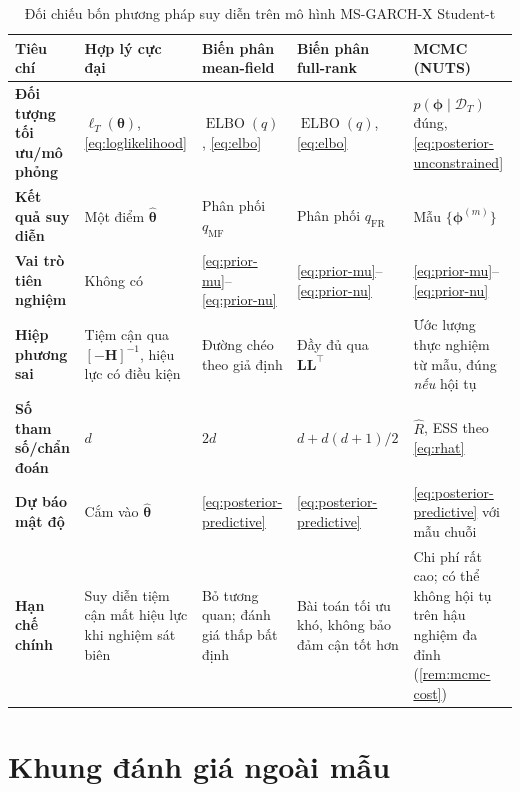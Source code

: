\documentclass[12pt,a4paper]{article}
\numberwithin{equation}{section}
\theoremstyle{definition}
\newcommand{\ELBO}{\operatorname{ELBO}}
\newcommand{\Data}{\mathcal{D}}
\newcommand{\Param}{\symbf{\theta}}
\newcommand{\vecphi}{\symbf{\phi}}
\begin{document}
	\begin{table}[H]
		\centering\scriptsize
		\setlength{\tabcolsep}{3pt}
		\caption{Đối chiếu bốn phương pháp suy diễn trên mô hình MS-GARCH-X Student-t}
		\label{tab:comparison}
		\begin{tabularx}{\textwidth}{>{\raggedright\arraybackslash\bfseries}p{2.0cm} Y Y Y Y}
			\toprule
			\textbf{Tiêu chí} & \textbf{Hợp lý cực đại} & \textbf{Biến phân mean-field} & \textbf{Biến phân full-rank} & \textbf{MCMC (NUTS)} \\
			\midrule
			Đối tượng tối ưu/mô phỏng & $\ell_T(\Param)$, \eqref{eq:loglikelihood} & $\ELBO(q)$, \eqref{eq:elbo} & $\ELBO(q)$, \eqref{eq:elbo} & $p(\vecphi\mid\Data_T)$ đúng, \eqref{eq:posterior-unconstrained} \\
			\addlinespace[0.2em]
			Kết quả suy diễn & Một điểm $\hat{\Param}$ & Phân phối $q_{\mathrm{MF}}$ & Phân phối $q_{\mathrm{FR}}$ & Mẫu $\{\vecphi^{(m)}\}$ \\
			\addlinespace[0.2em]
			Vai trò tiên nghiệm & Không có & \eqref{eq:prior-mu}--\eqref{eq:prior-nu} & \eqref{eq:prior-mu}--\eqref{eq:prior-nu} & \eqref{eq:prior-mu}--\eqref{eq:prior-nu} \\
			\addlinespace[0.2em]
			Hiệp phương sai & Tiệm cận qua $[-\symbf H]^{-1}$, hiệu lực có điều kiện & Đường chéo theo giả định & Đầy đủ qua $\symbf L\symbf L^{\top}$ & Ước lượng thực nghiệm từ mẫu, đúng \emph{nếu} hội tụ \\
			\addlinespace[0.2em]
			Số tham số/chẩn đoán & $d$ & $2d$ & $d+d(d+1)/2$ & $\widehat R$, ESS theo \eqref{eq:rhat} \\
			\addlinespace[0.2em]
			Dự báo mật độ & Cắm vào $\hat{\Param}$ & \eqref{eq:posterior-predictive} & \eqref{eq:posterior-predictive} & \eqref{eq:posterior-predictive} với mẫu chuỗi \\
			\addlinespace[0.2em]
			Hạn chế chính & Suy diễn tiệm cận mất hiệu lực khi nghiệm sát biên & Bỏ tương quan; đánh giá thấp bất định & Bài toán tối ưu khó, không bảo đảm cận tốt hơn & Chi phí rất cao; có thể không hội tụ trên hậu nghiệm đa đỉnh (\cref{rem:mcmc-cost}) \\
			\bottomrule
		\end{tabularx}
	\end{table}

	
	\section{Khung đánh giá ngoài mẫu}\label{sec:oos}
	
\end{document}
